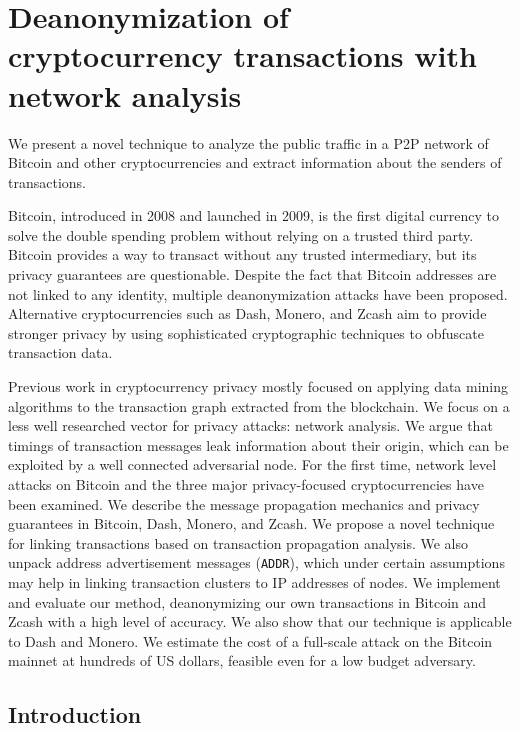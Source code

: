 \chapter{Deanonymization of cryptocurrency transactions with network analysis} %

\label{Chapter03_Clustering}

We present a novel technique to analyze the public traffic in a P2P network of Bitcoin and other cryptocurrencies and extract information about the senders of transactions.

Bitcoin, introduced in 2008 and launched in 2009, is the first digital currency to solve the double spending problem without relying on a trusted third party.
Bitcoin provides a way to transact without any trusted intermediary, but its privacy guarantees are questionable.
Despite the fact that Bitcoin addresses are not linked to any identity, multiple deanonymization attacks have been proposed.
Alternative cryptocurrencies such as Dash, Monero, and Zcash aim to provide stronger privacy by using sophisticated cryptographic techniques to obfuscate transaction data.

Previous work in cryptocurrency privacy mostly focused on applying data mining algorithms to the transaction graph extracted from the blockchain.
We focus on a less well researched vector for privacy attacks: network analysis.
We argue that timings of transaction messages leak information about their origin, which can be exploited by a well connected adversarial node.
For the first time, network level attacks on Bitcoin and the three major privacy-focused cryptocurrencies have been examined.
We describe the message propagation mechanics and privacy guarantees in Bitcoin, Dash, Monero, and Zcash.
We propose a novel technique for linking transactions based on transaction propagation analysis.
We also unpack address advertisement messages (\texttt{ADDR}), which under certain assumptions may help in linking transaction clusters to IP addresses of nodes.
We implement and evaluate our method, deanonymizing our own transactions in Bitcoin and Zcash with a high level of accuracy.
We also show that our technique is applicable to Dash and Monero.
We estimate the cost of a full-scale attack on the Bitcoin mainnet at hundreds of US dollars, feasible even for a low budget adversary.


\section{Introduction}

